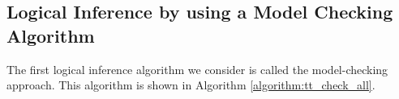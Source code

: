 %
%





\subsection{Logical Inference by using a Model Checking Algorithm}
\label{subsec:Inference_Model_Checking}

The first logical inference algorithm we consider is called the model-checking approach. This algorithm is shown in Algorithm \ref{algorithm:tt_check_all}.

